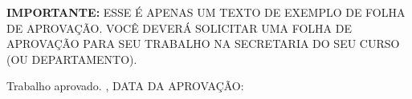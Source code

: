 \documentclass[
    12pt,               %
    openright,          %
    oneside,            %
    a4paper,            %
    section=TITLE,     %
    english,            %
    french,             %
    spanish,            %
    brazil              %
    ]{abntex2}
\renewcommand{\ABNTEXchapterfont}{\sffamily}
\renewcommand{\ABNTEXsubsectionfontsize}{\normalsize}
\renewcommand{\ABNTEXchapterfont}{\sffamily\bfseries}
\begin{document}


\begin{folhadeaprovacao}
  
  \begin{center}
    {\ABNTEXchapterfont\ABNTEXsubsectionfontsize\imprimirautor}

    \vspace*{\fill}\vspace*{\fill}
    {\ABNTEXchapterfont\ABNTEXsubsectionfontsize\bfseries\imprimirtitulo}
    \vspace*{\fill}
    
    \hspace{.45\textwidth}
    \begin{minipage}{.5\textwidth}
        \textbf{IMPORTANTE:} ESSE É APENAS UM TEXTO DE EXEMPLO DE FOLHA DE
        APROVAÇÃO. VOCÊ DEVERÁ SOLICITAR UMA FOLHA DE
        APROVAÇÃO PARA SEU TRABALHO NA SECRETARIA DO SEU CURSO (OU
        DEPARTAMENTO).
    \end{minipage}%
    \vspace*{\fill}
   \end{center}
        
   Trabalho aprovado. \imprimirlocal, DATA DA APROVAÇÃO:

      
   \begin{center}
    \vspace*{0.5cm}
    {\ABNTEXchapterfont\ABNTEXsubsectionfontsize\imprimirlocal}
    \par
    {\ABNTEXchapterfont\ABNTEXsubsectionfontsize\imprimirdata}
    \vspace*{1cm}
  \end{center}
  
\end{folhadeaprovacao}



\end{document}
